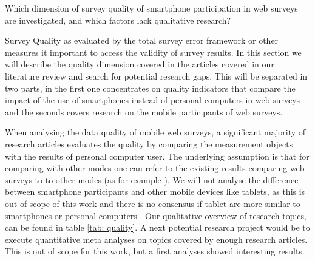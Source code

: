 Which dimension of survey quality of smartphone participation in web surveys are investigated, and which factors lack qualitative research?

Survey Quality as evaluated by the total survey error framework \cite{groves_total_2010} or other measures it important to access the validity of survey results. In this section we will describe the quality dimension covered in the articles covered in our literature review and search for potential research gaps. This will be separated in two parts, in the first one concentrates on quality indicators that compare the impact of the use of smartphones instead of personal computers in web surveys and the seconds covers research on the mobile participants of web surveys.

When analysing the data quality of mobile web surveys, a significant majority of research articles evaluates the quality by comparing the measurement objects with the results of personal computer user. The underlying assumption is that for comparing with other modes one can refer to the existing results comparing web surveys to to other modes (as for example \cite{manfreda_web_208, ryan_survey_2020, evans_the_2018}). We will not analyse the difference between smartphone participants and other mobile devices like tablets, as this is out of scope of this work and there is no consensus if tablet are more similar to smartphones or personal computers \cite{couper_why_2017}. Our qualitative overview of research topics, can be found in table \ref{tab: quality}. A next potential research project would be to execute quantitative meta analyses on topics covered by enough research articles. This is out of scope for this work, but a first analyses showed interesting results. 


